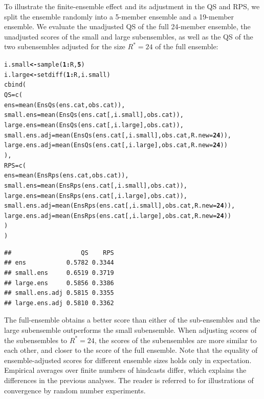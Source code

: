 \documentclass[article]{jss}\usepackage[]{graphicx}\usepackage[]{color}
\makeatletter
\newcommand{\hlnum}[1]{\textcolor[rgb]{0.502,0,0.502}{\textbf{#1}}}%
\newcommand{\hlopt}[1]{\textcolor[rgb]{1,0,0.502}{\textbf{#1}}}%
\newcommand{\hlstd}[1]{\textcolor[rgb]{0,0,0}{#1}}%
\newcommand{\hlkwb}[1]{\textcolor[rgb]{0.502,0.502,0.753}{\textbf{#1}}}%
\newcommand{\hlkwc}[1]{\textcolor[rgb]{0,0.502,0.753}{#1}}%
\newcommand{\hlkwd}[1]{\textcolor[rgb]{0,0.267,0.4}{#1}}%
\newenvironment{kframe}{%
 \def\at@end@of@kframe{}%
 \ifinner\ifhmode%
  \def\at@end@of@kframe{\end{minipage}}%
  \begin{minipage}{\columnwidth}%
 \fi\fi%
 \def\FrameCommand##1{\hskip\@totalleftmargin \hskip-\fboxsep
 \colorbox{shadecolor}{##1}\hskip-\fboxsep
     \hskip-\linewidth \hskip-\@totalleftmargin \hskip\columnwidth}%
 \MakeFramed {\advance\hsize-\width
   \@totalleftmargin\z@ \linewidth\hsize
   \@setminipage}}%
 {\par\unskip\endMakeFramed%
 \at@end@of@kframe}
\newenvironment{knitrout}{}{} %
\makeatother
\begin{document}
To illustrate the finite-ensemble effect and its adjustment in the QS and RPS, we split the ensemble randomly into a 5-member ensemble and a 19-member ensemble. 
We evaluate the unadjusted QS of the full 24-member ensemble, the unadjusted scores of the small and large subensembles, as well as the QS of the two subensembles adjusted for the size $R^*=24$ of the full ensemble:
%
\begin{knitrout}
\color{fgcolor}\begin{kframe}
\begin{alltt}
\hlstd{i.small} \hlkwb{<-} \hlkwd{sample}\hlstd{(}\hlnum{1}\hlopt{:}\hlstd{R,} \hlnum{5}\hlstd{)}
\hlstd{i.large} \hlkwb{<-} \hlkwd{setdiff}\hlstd{(}\hlnum{1}\hlopt{:}\hlstd{R, i.small)}
\hlkwd{cbind}\hlstd{(}
 \hlkwc{QS} \hlstd{=} \hlkwd{c}\hlstd{(}
  \hlkwc{ens}           \hlstd{=} \hlkwd{mean}\hlstd{(}\hlkwd{EnsQs}\hlstd{(ens.cat,            obs.cat)),}
  \hlkwc{small.ens}     \hlstd{=} \hlkwd{mean}\hlstd{(}\hlkwd{EnsQs}\hlstd{(ens.cat[, i.small], obs.cat)),}
  \hlkwc{large.ens}     \hlstd{=} \hlkwd{mean}\hlstd{(}\hlkwd{EnsQs}\hlstd{(ens.cat[, i.large], obs.cat)),}
  \hlkwc{small.ens.adj} \hlstd{=} \hlkwd{mean}\hlstd{(}\hlkwd{EnsQs}\hlstd{(ens.cat[, i.small], obs.cat,} \hlkwc{R.new}\hlstd{=}\hlnum{24}\hlstd{)),}
  \hlkwc{large.ens.adj} \hlstd{=} \hlkwd{mean}\hlstd{(}\hlkwd{EnsQs}\hlstd{(ens.cat[, i.large], obs.cat,} \hlkwc{R.new}\hlstd{=}\hlnum{24}\hlstd{))}
 \hlstd{),}
 \hlkwc{RPS} \hlstd{=} \hlkwd{c}\hlstd{(}
  \hlkwc{ens}           \hlstd{=} \hlkwd{mean}\hlstd{(}\hlkwd{EnsRps}\hlstd{(ens.cat,            obs.cat)),}
  \hlkwc{small.ens}     \hlstd{=} \hlkwd{mean}\hlstd{(}\hlkwd{EnsRps}\hlstd{(ens.cat[, i.small], obs.cat)),}
  \hlkwc{large.ens}     \hlstd{=} \hlkwd{mean}\hlstd{(}\hlkwd{EnsRps}\hlstd{(ens.cat[, i.large], obs.cat)),}
  \hlkwc{small.ens.adj} \hlstd{=} \hlkwd{mean}\hlstd{(}\hlkwd{EnsRps}\hlstd{(ens.cat[, i.small], obs.cat,} \hlkwc{R.new}\hlstd{=}\hlnum{24}\hlstd{)),}
  \hlkwc{large.ens.adj} \hlstd{=} \hlkwd{mean}\hlstd{(}\hlkwd{EnsRps}\hlstd{(ens.cat[, i.large], obs.cat,} \hlkwc{R.new}\hlstd{=}\hlnum{24}\hlstd{))}
 \hlstd{)}
\hlstd{)}
\end{alltt}
\begin{verbatim}
##                   QS    RPS
## ens           0.5782 0.3344
## small.ens     0.6519 0.3719
## large.ens     0.5856 0.3386
## small.ens.adj 0.5815 0.3355
## large.ens.adj 0.5810 0.3362
\end{verbatim}
\end{kframe}
\end{knitrout}
%
The full-ensemble obtains a better score than either of the sub-ensembles and the large subensemble outperforms the small subensemble.
When adjusting scores of the subensembles to $R^*=24$, the scores of the subensembles are more similar to each other, and closer to the score of the full ensemble.
Note that the equality of ensemble-adjusted scores for different ensemble sizes holds only in expectation. 
Empirical averages over finite numbers of hindcasts differ, which explains the differences in the previous analyses.
The reader is referred to \citet{ferro2013fair} for illustrations of convergence by random number experiments.
\end{document}
